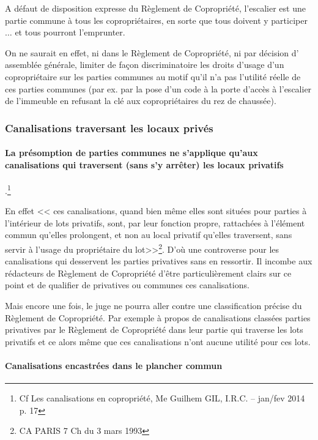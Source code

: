 		A défaut de disposition expresse du Règlement de Copropriété, l'escalier est une partie commune à tous
		les copropriétaires, en sorte que tous doivent y participer $\dots$ et tous pourront l'emprunter.
		
		On ne saurait en effet, ni dans le Règlement de Copropriété, ni par décision d' assemblée générale, limiter
		de façon discriminatoire les droits d'usage d'un copropriétaire sur les parties communes au motif qu'il n'a
		pas l'utilité réelle de ces parties communes (par ex. par la pose d’un code à la porte d'accès à l'escalier de
		l'immeuble en refusant la clé aux copropriétaires du rez de chaussée).
		
		\subsubsection{Canalisations traversant les locaux privés}
		
		\paragraph{La présomption de parties communes ne s'applique qu'aux canalisations qui
		traversent (sans s’y arrêter) les locaux privatifs}.\footnote{Cf Les canalisations en copropriété, Me Guilhem GIL, I.R.C.  – jan/fev 2014 p. 17}
	
		En effet << ces canalisations, quand bien même elles sont situées pour parties à l'intérieur de lots privatifs,
		sont, par leur fonction propre, rattachées à l'élément commun qu'elles prolongent, et non au local privatif
		qu'elles traversent, sans servir à l'usage du propriétaire du lot>>\footnote{CA PARIS 7\degre{} Ch du 3 mars 1993}.
		D'où une controverse pour les canalisations qui desservent les parties privatives sans en ressortir. Il
		incombe aux rédacteurs de Règlement de Copropriété d'être particulièrement clairs sur ce point et de
		qualifier de privatives ou communes ces canalisations.
		
		Mais encore une fois, le juge ne pourra aller contre une classification précise du Règlement de Copropriété.
		Par exemple à propos de canalisations classées parties privatives par le Règlement de Copropriété dans
		leur partie qui traverse les lots privatifs et ce alors même que ces canalisations n'ont aucune utilité pour
		ces lots.
		
		\paragraph{Canalisations encastrées dans le plancher commun}
		
